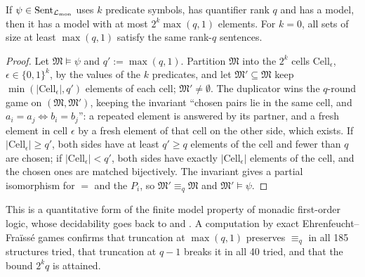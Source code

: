 \begin{lemma}\label{lem:terms:monadic}
If $\psi\in\mathrm{Sent}_{\mathcal L_{\rm mon}}$ uses $k$ predicate symbols, has quantifier rank $q$ and has a model, then it has a model with at most $2^k\max(q,1)$ elements. For $k=0$, all sets of size at least $\max(q,1)$ satisfy the same rank-$q$ sentences.
\end{lemma}

\begin{proof}
Let $\mathfrak M\models\psi$ and $q':=\max(q,1)$. Partition $\mathfrak M$ into the $2^k$ cells $\mathrm{Cell}_\epsilon$, $\epsilon\in\{0,1\}^k$, by the values of the $k$ predicates, and let $\mathfrak M'\subseteq\mathfrak M$ keep $\min(\lvert\mathrm{Cell}_\epsilon\rvert,q')$ elements of each cell; $\mathfrak M'\ne\emptyset$. The duplicator wins the $q$-round game on $(\mathfrak M,\mathfrak M')$, keeping the invariant ``chosen pairs lie in the same cell, and $a_i=a_j\iff b_i=b_j$'': a repeated element is answered by its partner, and a fresh element in cell $\epsilon$ by a fresh element of that cell on the other side, which exists. If $\lvert\mathrm{Cell}_\epsilon\rvert\ge q'$, both sides have at least $q'\ge q$ elements of the cell and fewer than $q$ are chosen; if $\lvert\mathrm{Cell}_\epsilon\rvert<q'$, both sides have exactly $\lvert\mathrm{Cell}_\epsilon\rvert$ elements of the cell, and the chosen ones are matched bijectively. The invariant gives a partial isomorphism for $=$ and the $P_i$, so $\mathfrak M'\equiv_q\mathfrak M$ and $\mathfrak M'\models\psi$.
\end{proof}

This is a quantitative form of the finite model property of monadic first-order logic, whose decidability goes back to \citet{lowenheim1915moglichkeiten} and \citet{behmann1922beitrage}. A computation by exact Ehrenfeucht--Fraïssé games confirms that truncation at $\max(q,1)$ preserves $\equiv_q$ in all 185 structures tried, that truncation at $q-1$ breaks it in all 40 tried, and that the bound $2^kq$ is attained.


